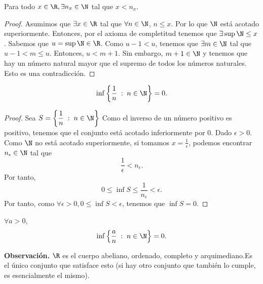 \begin{ftheorem}
\normalfont Para todo $\displaystyle x \in \R, \exists n_{x} \in \N $ tal que $\displaystyle x < n_{x} $.
\end{ftheorem}

\begin{proof}
Asumimos que $\displaystyle \exists x \in \R $ tal que $\displaystyle \forall n \in \N $, $\displaystyle n \leq x $. Por lo que $\displaystyle \N $ está acotado superiormente. Entonces, por el axioma de completitud tenemos que $\displaystyle \exists \sup\N \leq x $. Sabemos que $\displaystyle u = \sup\N \in \R $. Como $\displaystyle u - 1 < u $, tenemos que $\displaystyle \exists m \in \N $ tal que $\displaystyle u - 1 < m \leq u $. Entonces, $\displaystyle u < m + 1 $. Sin embargo, $\displaystyle m + 1 \in \N $ y tenemos que hay un número natural mayor que el supremo de todos los números naturales. Esto es una contradicción.
\end{proof}

\begin{fcolorary}[]
\normalfont 
\[\inf \left\{ \frac{1}{n}\; : \; n \in \N\right\} = 0 .\]
\end{fcolorary}

\begin{proof}
Sea $\displaystyle S = \left\{ \frac{1}{n}\; : \; n \in \N\right\} $ Como el inverso de un número positivo es positivo, tenemos que el conjunto está acotado inferiormente por 0. Dado $\displaystyle \epsilon > 0 $. Como $\displaystyle \N $ no está acotado superiormente, si tomamos $\displaystyle x = \frac{1}{\epsilon } $, podemos encontrar $\displaystyle n_{\epsilon } \in \N $ tal que 
\[\frac{1}{\epsilon } < n_{\epsilon } .\]
Por tanto, 
\[0 \leq \inf S \leq \frac{1}{n_{\epsilon}} < \epsilon .\]
Por tanto, como $\displaystyle \forall \epsilon > 0, 0 \leq \inf S < \epsilon  $, tenemos que $\displaystyle \inf S = 0 $.
\end{proof}

\begin{fcolorary}[]
\normalfont $\displaystyle \forall a > 0 $, 
\[ \inf \left\{ \frac{a}{n}\; : \; n \in \N\right\} = 0 .\]
\end{fcolorary}

\textbf{Observación.} $\displaystyle \R $ es el cuerpo abeliano, ordenado, completo y arquimediano.Es el único conjunto que satisface esto (si hay otro conjunto que también lo cumple, es esencialmente el mismo).

